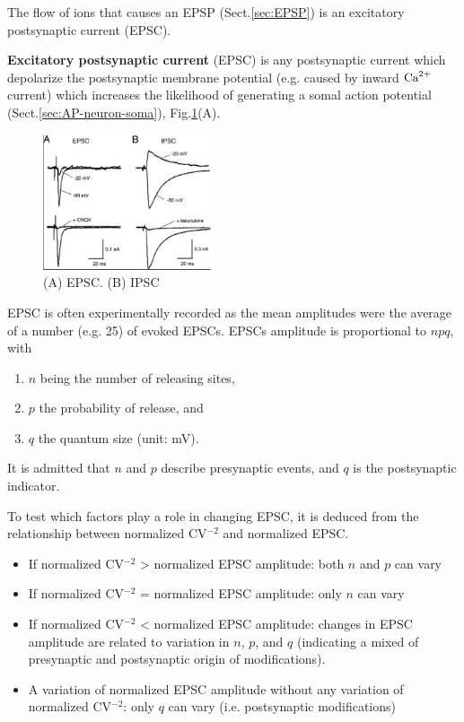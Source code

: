 The flow of ions that causes an EPSP (Sect.\ref{sec:EPSP}) is an excitatory
postsynaptic current (EPSC). 

{\bf Excitatory postsynaptic current} (EPSC) is any postsynaptic current which
depolarize the postsynaptic membrane potential (e.g. caused by inward ${\text{Ca}^{2+}}$
current) which increases the likelihood of generating a somal action potential
(Sect.\ref{sec:AP-neuron-soma}), Fig.\ref{fig:EPSC_IPSC}(A).

\begin{figure}[hbt]
  \centerline{\includegraphics[height=4cm,
    angle=0]{./images/EPSC_IPSC.eps}}
\caption{(A) EPSC. (B) IPSC}
\label{fig:EPSC_IPSC}
\end{figure}

EPSC is often experimentally recorded as the mean amplitudes were the average of
a number (e.g. 25) of evoked EPSCs.
EPSCs amplitude is proportional to $npq$, with 
\begin{enumerate}
  \item  $n$ being the number of releasing sites, 
  
  \item $p$ the probability of release,
  and 
  
  \item $q$ the quantum size (unit: mV). 
\end{enumerate}
It is admitted that $n$ and $p$ describe presynaptic events, and $q$
is the postsynaptic indicator.

To test which factors play a role in changing EPSC, 
it is deduced from the relationship between normalized CV$^{-2}$ and normalized
EPSC.
\begin{itemize}
  \item If normalized CV$^{-2}$ > normalized EPSC amplitude: both $n$ and $p$
  can vary
  
  \item If normalized CV$^{-2}$ = normalized EPSC amplitude: only $n$ can vary
  
  \item If normalized CV$^{-2}$ < normalized EPSC amplitude: changes in EPSC
  amplitude are related to variation in $n$, $p$, and $q$ (indicating a mixed
  of presynaptic and postsynaptic origin of modifications).
  
  \item A variation of normalized EPSC amplitude
without any variation of normalized CV$^{-2}$: only $q$ can vary (i.e.
postsynaptic modifications)
\end{itemize}

